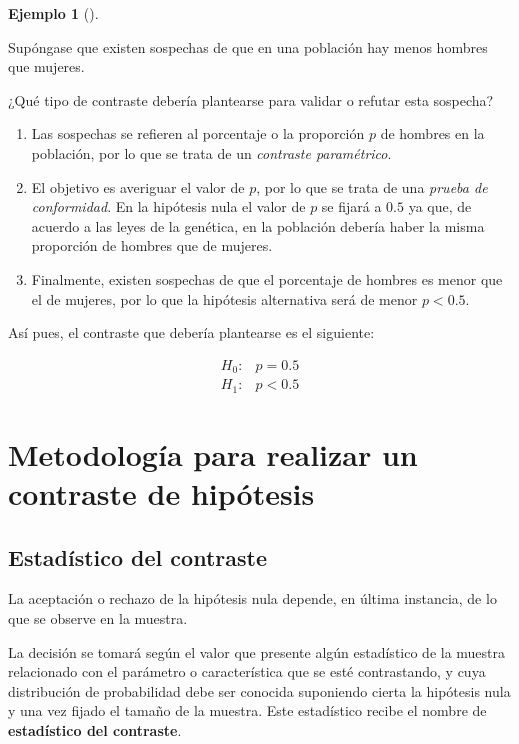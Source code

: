 \documentclass[
  a4paper,
]{scrreport}
\theoremstyle{plain}
\theoremstyle{definition}
\theoremstyle{definition}
\newtheorem{example}{Ejemplo}[chapter]
\theoremstyle{remark}
\begin{document}
\begin{example}[]\protect\hypertarget{exm-eleccion-tipo-contraste}{}\label{exm-eleccion-tipo-contraste}

Supóngase que existen sospechas de que en una población hay menos
hombres que mujeres.

¿Qué tipo de contraste debería plantearse para validar o refutar esta
sospecha?

\begin{enumerate}
\def\labelenumi{\arabic{enumi}.}
\item
  Las sospechas se refieren al porcentaje o la proporción \(p\) de
  hombres en la población, por lo que se trata de un \emph{contraste
  paramétrico}.
\item
  El objetivo es averiguar el valor de \(p\), por lo que se trata de una
  \emph{prueba de conformidad}. En la hipótesis nula el valor de \(p\)
  se fijará a \(0.5\) ya que, de acuerdo a las leyes de la genética, en
  la población debería haber la misma proporción de hombres que de
  mujeres.
\item
  Finalmente, existen sospechas de que el porcentaje de hombres es menor
  que el de mujeres, por lo que la hipótesis alternativa será de menor
  \(p<0.5\).
\end{enumerate}

Así pues, el contraste que debería plantearse es el siguiente:

\begin{align*}
H_0: & p=0.5 \\
H_1: & p<0.5
\end{align*}

\end{example}

\section{Metodología para realizar un contraste de
hipótesis}\label{metodologuxeda-para-realizar-un-contraste-de-hipuxf3tesis}

\subsection{Estadístico del
contraste}\label{estaduxedstico-del-contraste}

La aceptación o rechazo de la hipótesis nula depende, en última
instancia, de lo que se observe en la muestra.

La decisión se tomará según el valor que presente algún estadístico de
la muestra relacionado con el parámetro o característica que se esté
contrastando, y cuya distribución de probabilidad debe ser conocida
suponiendo cierta la hipótesis nula y una vez fijado el tamaño de la
muestra. Este estadístico recibe el nombre de \textbf{estadístico del
contraste}.
\end{document}
